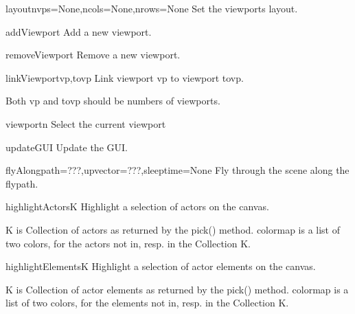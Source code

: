 \begin{funcdesc}{layout}{nvps=None,ncols=None,nrows=None}
Set the viewports layout.

\end{funcdesc}


\begin{funcdesc}{addViewport}{}
Add a new viewport.

\end{funcdesc}


\begin{funcdesc}{removeViewport}{}
Remove a new viewport.

\end{funcdesc}


\begin{funcdesc}{linkViewport}{vp,tovp}
Link viewport vp to viewport tovp.

    Both vp and tovp should be numbers of viewports. 
    

\end{funcdesc}


\begin{funcdesc}{viewport}{n}
Select the current viewport

\end{funcdesc}


\begin{funcdesc}{updateGUI}{}
Update the GUI.

\end{funcdesc}


\begin{funcdesc}{flyAlong}{path=???,upvector=???,sleeptime=None}
Fly through the scene along the flypath.

\end{funcdesc}


\begin{funcdesc}{highlightActors}{K}
Highlight a selection of actors on the canvas.

    K is Collection of actors as returned by the pick() method.
    colormap is a list of two colors, for the actors not in, resp. in
    the Collection K.
    

\end{funcdesc}


\begin{funcdesc}{highlightElements}{K}
Highlight a selection of actor elements on the canvas.

    K is Collection of actor elements as returned by the pick() method.
    colormap is a list of two colors, for the elements not in, resp. in
    the Collection K.
    

\end{funcdesc}


